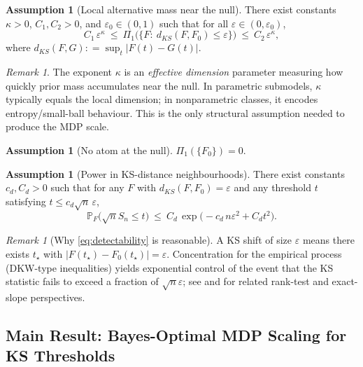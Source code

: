 \documentclass[11pt]{article}
\newcommand{\defeq}{\mathrel{\mathop:}=}
\newcommand{\1}{\mathbf{1}}
\newcommand{\PP}{\mathbb{P}}
\theoremstyle{plain}
\theoremstyle{definition}
\newtheorem{assumption}[theorem]{Assumption}
\theoremstyle{remark}
\newtheorem{remark}[theorem]{Remark}
\begin{document}
\begin{assumption}[Local alternative mass near the null]\label{ass:prior-local}
There exist constants $\kappa>0$, $C_1,C_2>0$, and $\varepsilon_0\in(0,1)$ such that for all $\varepsilon\in(0,\varepsilon_0)$,
\begin{equation}\label{eq:local-mass}
C_1\,\varepsilon^{\kappa}\ \le\
\Pi_1\!\big(\{F:\ d_{KS}(F,F_0)\le \varepsilon\}\big)
\ \le\ C_2\,\varepsilon^{\kappa},
\end{equation}
where $d_{KS}(F,G)\defeq \sup_t|F(t)-G(t)|$.
\end{assumption}

\begin{remark}
The exponent $\kappa$ is an \emph{effective dimension} parameter measuring how quickly prior mass accumulates near the null.
In parametric submodels, $\kappa$ typically equals the local dimension; in nonparametric classes, it encodes entropy/small-ball behaviour.
This is the only structural assumption needed to produce the MDP scale.
\end{remark}

\begin{assumption}[No atom at the null]\label{ass:no-atom}
$\Pi_1(\{F_0\})=0$.
\end{assumption}

\begin{assumption}[Power in KS-distance neighbourhoods]\label{ass:detectability}
There exist constants $c_d,C_d>0$ such that for any $F$ with $d_{KS}(F,F_0)=\varepsilon$ and any threshold $t$ satisfying $t\le c_d\sqrt{n}\,\varepsilon$,
\begin{equation}\label{eq:detectability}
\PP_F\!\big(\sqrt{n}S_n\le t\big)
\ \le\
C_d\,\exp\!\big(-c_d\,n\varepsilon^2 + C_d t^2\big).
\end{equation}
\end{assumption}

\begin{remark}[Why \eqref{eq:detectability} is reasonable]
A KS shift of size $\varepsilon$ means there exists $t_\star$ with $|F(t_\star)-F_0(t_\star)|=\varepsilon$.
Concentration for the empirical process (DKW-type inequalities) yields exponential control of the event that the KS statistic fails to exceed a fraction of $\sqrt{n}\varepsilon$; see \citet{HajekSidak1967} and \citet{Sievers1969} for related rank-test and exact-slope perspectives.
\end{remark}


\subsection{Main Result: Bayes-Optimal MDP Scaling for KS Thresholds}
\end{document}
